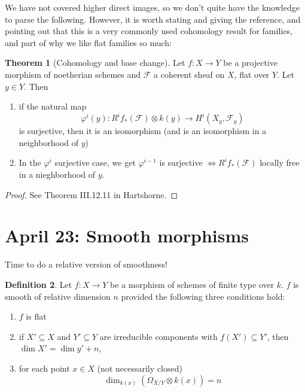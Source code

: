 \documentclass[10pt,reqno]{amsart}
\theoremstyle{definition}
\newtheorem{theorem}{Theorem}
\newtheorem{definition}[theorem]{Definition}
\theoremstyle{remark}
\numberwithin{equation}{section}
\numberwithin{theorem}{section}
\newcommand{\FF}{{\mathscr F}}
\begin{document}
We have not covered higher direct images, so we don't quite have the knowledge to parse the following. However, it is worth stating and giving the reference, and pointing out that this is a very commonly used cohomology result for families, and part of why we like flat families so much:

\begin{theorem}[Cohomology and base change] Let $f: X \to Y$ be a projective morphism of noetherian schemes and $\FF$ a coherent sheaf on $X$, flat over $Y$. Let $y \in Y$. Then
\begin{enumerate}
\item if the natural map 
\[\varphi^i(y): R^if_*(\FF) \otimes k(y) \to H^i(X_y,\FF_y)\]
is surjective, then it is an isomorphism (and is an isomorphism in a neighborhood of $y$)
\item In the $\varphi^i$ surjective case, we get $\varphi^{i-1}$ is surjective $\iff R^i f_*(\FF)$ locally free in a nieghborhood of $y$.
\end{enumerate}
\end{theorem}
\begin{proof} See Theorem III.12.11 in Hartshorne.
\end{proof}
\section{April 23: Smooth morphisms}
Time to do a relative version of smoothness! 

\begin{definition} Let $f: X \to Y$ be a morphism of schemes of finite type over $k$. $f$ is smooth of relative dimension $n$ provided the following three conditions hold:
\begin{enumerate}
\item $f$ is flat
\item if $X' \subseteq X$ and $Y' \subseteq Y$ are irreducible components with $f(X') \subseteq Y'$, then $\dim X' = \dim y' + n$,
\item for each point $x \in X$ (not necessarily closed)
\[ \dim_{k(x)} (\Omega_{X/Y} \otimes k(x)) = n\]
\end{enumerate}
\end{definition}
\end{document}
